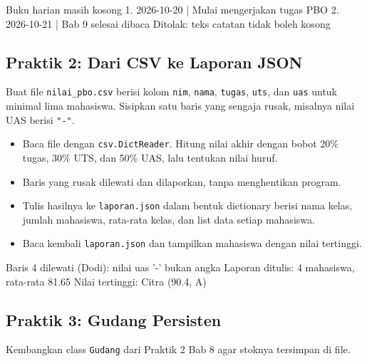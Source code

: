 \begin{keluaran}
Buku harian masih kosong
1. 2026-10-20 | Mulai mengerjakan tugas PBO
2. 2026-10-21 | Bab 9 selesai dibaca
Ditolak: teks catatan tidak boleh kosong
\end{keluaran}

\subsection{Praktik 2: Dari CSV ke Laporan JSON}

Buat file \texttt{nilai\_pbo.csv} berisi kolom \texttt{nim}, \texttt{nama}, \texttt{tugas}, \texttt{uts}, dan \texttt{uas} untuk minimal lima mahasiswa. Sisipkan satu baris yang sengaja rusak, misalnya nilai UAS berisi \texttt{"-"}.

\begin{itemize}
  \item Baca file dengan \texttt{csv.DictReader}. Hitung nilai akhir dengan bobot 20\% tugas, 30\% UTS, dan 50\% UAS, lalu tentukan nilai huruf.
  \item Baris yang rusak dilewati dan dilaporkan, tanpa menghentikan program.
  \item Tulis hasilnya ke \texttt{laporan.json} dalam bentuk dictionary berisi nama kelas, jumlah mahasiswa, rata-rata kelas, dan list data setiap mahasiswa.
  \item Baca kembali \texttt{laporan.json} dan tampilkan mahasiswa dengan nilai tertinggi.
\end{itemize}

\begin{keluaran}
Baris 4 dilewati (Dodi): nilai uas '-' bukan angka
Laporan ditulis: 4 mahasiswa, rata-rata 81.65
Nilai tertinggi: Citra (90.4, A)
\end{keluaran}

\subsection{Praktik 3: Gudang Persisten}

Kembangkan class \texttt{Gudang} dari Praktik 2 Bab 8 agar stoknya tersimpan di file.

